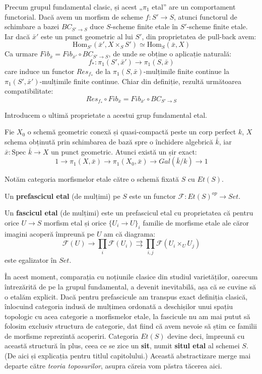 \documentclass[13pt,openany]{book}
\begin{document}
Precum grupul fundamental clasic, și acest „$\pi_1$ etal” are un comportament functorial. Dacă avem un morfism de scheme $f: S' \rightarrow S$, atunci functorul de schimbare a bazei $BC_{S'\rightarrow S}$ duce $S$-scheme finite etale în $S'$-scheme finite etale. Iar dacă $\bar{x}'$ este un punct geometric al lui $S'$, din proprietatea de pull-back avem:
$$\text{Hom}_{S'}(\bar{x}',X \times_S S')\simeq \text{Hom}_S(\bar{x},X)$$
Ca urmare $Fib_{\bar{x}} = Fib_{\bar{x}'} \circ BC_{S'\rightarrow S}$, de unde se obține o aplicație naturală:
$$f_* : \pi_1(S',\bar{x}') \rightarrow \pi_1(S,\bar{x})$$
care induce un functor $Res_{f_*}$ de la $\pi_1(S,\bar{x})$-mulțimile finite continue la $\pi_1(S',\bar{x}')$-mulțimile finite continue. Chiar din definiție, rezultă următoarea compatibilitate:
$$Res_{f_*} \circ Fib_{\bar{x}} = Fib_{\bar{x}'} \circ BC_{S'\rightarrow S}$$

Introducem o ultimă proprietate a acestui grup fundamental etal.

\begin{teo}
Fie $X_0$ o schemă geometric conexă și quasi-compactă peste un corp perfect $k$, $X$ schema obținută prin schimbarea de bază spre o închidere algebrică $\bar{k}$, iar $\bar{x} : \text{Spec }\bar{k} \rightarrow X$ un punct geometric. Atunci există un șir exact:
$$1 \rightarrow \pi_1(X,\bar{x}) \rightarrow \pi_1(X_0,\bar{x}) \rightarrow Gal(\bar{k}/k) \rightarrow 1$$
\end{teo}

Notăm categoria morfismelor etale către o schemă fixată $S$ cu $Et(S)$.

\begin{defi}
Un {\bf prefascicul etal} (de mulțimi) pe $S$ este un functor $\mathcal{F} : Et(S)^{op} \rightarrow Set$.
\end{defi}

\begin{defi}
Un {\bf fascicul etal} (de mulțimi) este un prefascicul etal cu proprietatea că pentru orice $U \rightarrow S$ morfism etal și orice $\{U_i \rightarrow U\}_i$ familie de morfisme etale ale căror imagini acoperă împreună pe $U$ am că diagrama:
$$\mathcal{F}(U) \rightarrow \prod_i \mathcal{F}(U_i) \rightrightarrows \prod_{i,j} \mathcal{F}(U_i \times_U U_j)$$
este egalizator în $Set$.
\end{defi}

În acest moment, comparația cu noțiunile clasice din studiul varietăților, oarecum întrezărită de pe la grupul fundamental, a devenit inevitabilă, așa că se cuvine să o etalăm explicit. Dacă pentru prefascicule am transpus exact definiția clasică, înlocuind categoria indusă de mulțimea ordonată a deschișilor unui spațiu topologic cu acea categorie a morfismelor etale, la fascicule nu am mai putut să folosim exclusiv structura de categorie, dat fiind că avem nevoie să știm ce familii de morfisme reprezintă acoperiri. Categoria $Et(S)$ devine deci, împreună cu această structură în plus, ceea ce se zice un {\bf sit}, numit {\bf situl etal} al schemei $S$. (De aici și explicația pentru titlul capitolului.) Această abstractizare merge mai departe către {\it teoria toposurilor}, asupra căreia vom păstra tăcerea aici.
\end{document}
